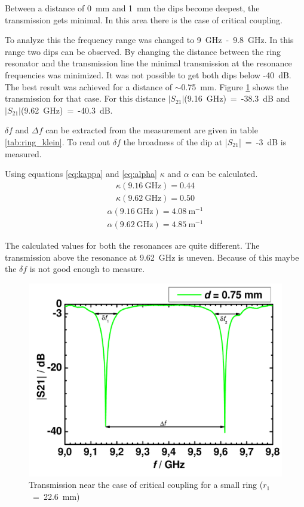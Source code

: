 Between a distance of 0~mm and 1~mm the dips become deepest, the transmission gets minimal. In this area there is the case of critical coupling. 

To analyze this the frequency range was changed to 9~GHz~-~9.8~GHz. In this range two dips can be observed. By changing the distance between the ring resonator and the transmission line the minimal transmission at the resonance frequencies was minimized. It was not possible to get both dips below -40~dB. The best result was achieved for a distance of $\sim$0.75~mm. Figure \ref{fig:03_075} shows the transmission for that case.
For this distance $|S_{21}|$(9.16~GHz)~=~-38.3~dB and  $|S_{21}|$(9.62~GHz)~=~-40.3~dB.

$\delta f$ and $\Delta f$ can be extracted from the measurement are given in table \ref{tab:ring_klein}. To read out $\delta f$ the broadness of the dip at |$S_{21}$|~=~-3~dB is measured. 

Using equations \eqref{eq:kappa} and \eqref{eq:alpha} $\kappa$ and $\alpha$ can be calculated.
\begin{equation}
\begin{split}
\kappa(9.16~\mathrm{GHz})=0.44\\
\kappa(9.62~\mathrm{GHz})=0.50
\end{split}
\label{eq:}
\end{equation}
\begin{equation}
\begin{split}
\alpha(9.16~\mathrm{GHz})=4.08~\mathrm{m}^{-1}\\
\alpha(9.62~\mathrm{GHz})=4.85~\mathrm{m}^{-1}
\end{split}
\label{eq:}
\end{equation}

The calculated values for both the resonances are quite different. The transmission above the resonance at 9.62~GHz is uneven. Because of this maybe the $\delta f$ is not good enough to measure. 

\begin{figure}%
\centering
\includegraphics[width=.6\columnwidth]{Grafiken/03_075.pdf}%
\caption{Transmission near the case of critical coupling for a small ring ($r_1$~=~22.6~mm)}%
\label{fig:03_075}%
\end{figure}

